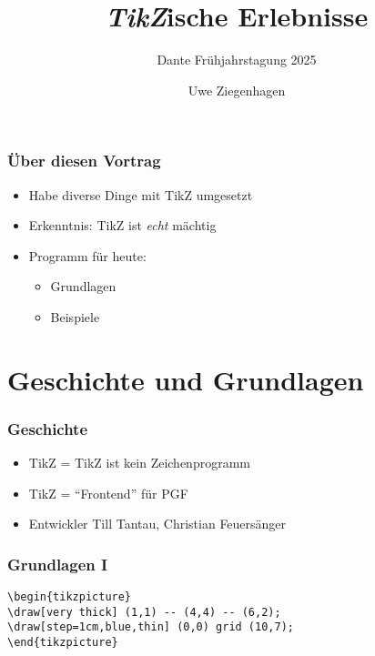 \documentclass[14pt,ngerman]{beamer}
\author{Uwe Ziegenhagen}
\title{\textit{TikZ}ische Erlebnisse}
\subtitle{Dante Frühjahrstagung 2025}
\begin{document}
\begin{frame}

\maketitle

\end{frame}

\begin{frame}
\frametitle{Über diesen Vortrag}

\begin{itemize}
\item Habe diverse Dinge mit TikZ umgesetzt
\item Erkenntnis: TikZ ist \textit{echt} mächtig 
\item Programm für heute: 
\begin{itemize}
	\item Grundlagen
	\item Beispiele
\end{itemize}

\end{itemize}
\end{frame}

\section{Geschichte und Grundlagen} 

\begin{frame}
\frametitle{Geschichte}

\begin{itemize}
\item TikZ = TikZ ist kein Zeichenprogramm
\item TikZ = \enquote{Frontend} für PGF
\item Entwickler Till Tantau, Christian Feuersänger
\end{itemize}
\end{frame}

\begin{frame}[containsverbatim]
\frametitle{Grundlagen I}

\begin{lstlisting}
\begin{tikzpicture}
\draw[very thick] (1,1) -- (4,4) -- (6,2);
\draw[step=1cm,blue,thin] (0,0) grid (10,7);
\end{tikzpicture}
\end{lstlisting}


\end{frame}
\end{document}
